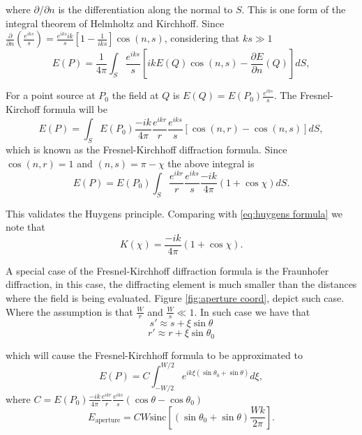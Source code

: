\documentclass[12pt,twoside,english]{book}
\renewcommand{\~}{\perispomeni}%
\numberwithin{equation}{section}
\numberwithin{figure}{section}
\begin{document}
where $\partial/\partial n$ is the differentiation along the normal to $S$. This is one form of the integral theorem of Helmholtz and Kirchhoff. Since $\frac{\partial}{\partial n}\left(\frac{e^{iks}}{s}\right)=\frac{e^{iks}ik}{s}\left[1-\frac{1}{iks}\right]\cos\left(n,s\right)$, considering that $ks\gg1$
\begin{equation}
E\left(P\right)=\frac{1}{4\pi}\int_{S}\frac{e^{iks}}{s}\left[ikE\left(Q\right)\cos\left(n,s\right)-\frac{\partial E}{\partial n}\left(Q\right)\right]dS,
\label{eq:integral theorem}
\end{equation}

For a point source at $P_{0}$ the field at $Q$ is $E\left(Q\right)=E\left(P_{0}\right)\frac{e^{iks}}{s}$.
The Fresnel-Kirchoff formula will be
\begin{equation}
E\left(P\right)=\int_{S}E\left(P_{0}\right)\frac{-ik}{4\pi}\frac{e^{ikr}}{r}\frac{e^{iks}}{s}\left[\cos\left(n,r\right)-\cos\left(n,s\right)\right]dS,
\label{eq:Fresnel-Kirchhoff}
\end{equation}
which is known as the Fresnel-Kirchhoff diffraction formula. Since $\cos\left(n,r\right)=1$ and $\left(n,s\right)=\pi-\chi$ the above integral is
\begin{equation}
E\left(P\right)=E\left(P_{0}\right)\int_{S}\frac{e^{ikr}}{r}\frac{e^{iks}}{s}\frac{-ik}{4\pi}\left(1+\cos\chi\right)dS.
\end{equation}

This validates the Huygens principle. Comparing with \ref{eq:huygens formula} we note that
\begin{equation}
K\left(\chi\right)=\frac{-ik}{4\pi}\left(1+\cos\chi\right).
\end{equation}


A special case of the Fresnel-Kirchhoff diffraction formula is the Fraunhofer diffraction, in this case, the diffracting element is much smaller than the distances where the field is being evaluated. Figure \ref{fig:aperture coord}, depict such case. Where the assumption is that $\frac{W}{r}$ and $\frac{W}{s}\ll1$. In such case we have that
\begin{equation}
s'\approx s+\xi\sin\theta
\end{equation}
\begin{equation}
r'\approx r+\xi\sin\theta_{0}
\end{equation}


which will cause the Fresnel-Kirchhoff formula to be approximated to
\begin{equation}
E\left(P\right)=C\int_{-W/2}^{W/2}e^{ik\xi\left(\sin\theta_{0}+\sin\theta\right)}d\xi,
\label{eq:Fraunhofer}
\end{equation}
where $C=E\left(P_{0}\right)\frac{-ik}{4\pi}\frac{e^{ikr}}{r}\frac{e^{iks}}{s}\left(\cos\theta-\cos\theta_{0}\right)$
\begin{equation}
E_{\text{aperture}}=CW\text{sinc}\left[\left(\sin\theta_{0}+\sin\theta\right)\frac{Wk}{2\pi}\right].
\end{equation}
\end{document}
